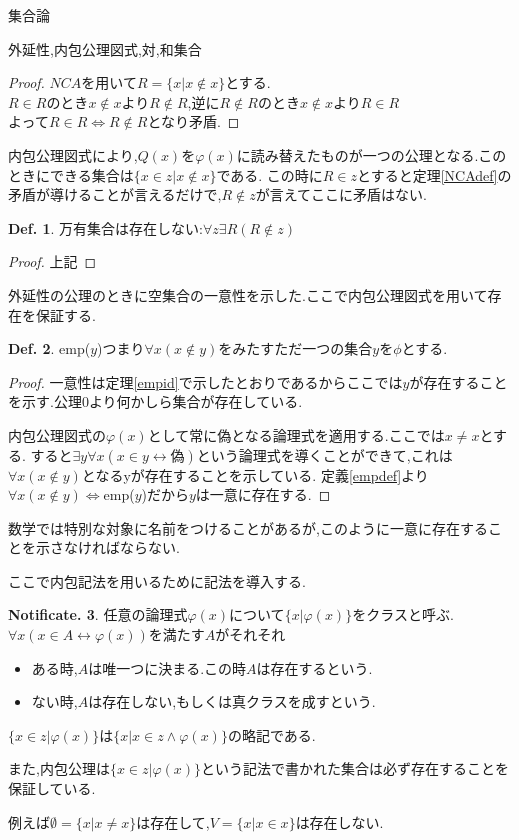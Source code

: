 \documentclass[14pt]{jsarticle}
\theoremstyle{definition}
\newtheorem{dfn}{Def.}[subsection]
\newtheorem{noti}[dfn]{Notificate.}
\begin{document}
\begin{section}{集合論}
\begin{subsection}{外延性,内包公理図式,対,和集合}
\begin{proof}
$NCA$を用いて$R=\{x|x\not \in x\}$とする.\\
$R \in R$のとき$x\not \in x$より$R \not \in R$,逆に$R\not \in R$のとき$x \not \in x$より$R\in R$\\
よって$R \in R \Leftrightarrow R \not \in R$となり矛盾.
\end{proof}
内包公理図式により,$Q(x)$を$\varphi (x)$に読み替えたものが一つの公理となる.このときにできる集合は$\{x\in z| x \not \in x\}$である.
この時に$R\in z$とすると定理\ref{NCAdef}の矛盾が導けることが言えるだけで,$R\not\in z$が言えてここに矛盾はない.

\begin{dfn}
\label{AllSet}
万有集合は存在しない:$\forall z \exists R ( R \not\in z)$
\end{dfn}
\begin{proof}
上記
\end{proof}
外延性の公理のときに空集合の一意性を示した.ここで内包公理図式を用いて存在を保証する.

\begin{dfn}
\label{empset}
emp($y$)つまり$\forall x(x \not\in y)$をみたすただ一つの集合$y$を$\phi$とする.
\end{dfn}
\begin{proof}
一意性は定理\ref{empid}で示したとおりであるからここでは$y$が存在することを示す.公理0より何かしら集合が存在している.\par
内包公理図式の$\varphi(x)$として常に偽となる論理式を適用する.ここでは$x \not = x$とする.
すると$\exists y \forall x(x\in y \leftrightarrow 偽)$という論理式を導くことができて,これは$\forall x(x \not\in y)$となるyが存在することを示している.
定義\ref{empdef}より$\forall x(x \not\in y) \Leftrightarrow$emp($y$)だから$y$は一意に存在する.
\end{proof}
数学では特別な対象に名前をつけることがあるが,このように一意に存在することを示さなければならない.\par

ここで内包記法を用いるために記法を導入する.
\begin{noti}
\label{setexist}
任意の論理式$\varphi(x)$について$\{x|\varphi(x)\}$をクラスと呼ぶ.$\forall x(x\in A \leftrightarrow \varphi (x))$を満たす$A$がそれそれ
\begin{itemize}
	\item  ある時,$A$は唯一つに決まる.この時$A$は存在するという.
	\item  ない時,$A$は存在しない,もしくは真クラスを成すという.
\end{itemize}
$\{x\in z|\varphi(x)\}$は$\{x|x\in z \land \varphi(x)\}$の略記である.\par
また,内包公理は$\{x\in z|\varphi(x)\}$という記法で書かれた集合は必ず存在することを保証している.
\end{noti}
例えば$\emptyset=\{x|x\not = x\}$は存在して,$V=\{x|x\in x\}$は存在しない.\\\par


\end{subsection}
\end{section}
\end{document}
